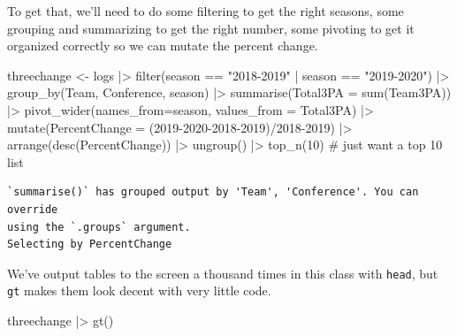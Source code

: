 \documentclass[
  letterpaper,
  DIV=11,
  numbers=noendperiod]{scrreprt}
\newenvironment{Shaded}{\begin{snugshade}}{\end{snugshade}}
\newcommand{\AttributeTok}[1]{\textcolor[rgb]{0.40,0.45,0.13}{#1}}
\newcommand{\CommentTok}[1]{\textcolor[rgb]{0.37,0.37,0.37}{#1}}
\newcommand{\DecValTok}[1]{\textcolor[rgb]{0.68,0.00,0.00}{#1}}
\newcommand{\FunctionTok}[1]{\textcolor[rgb]{0.28,0.35,0.67}{#1}}
\newcommand{\NormalTok}[1]{\textcolor[rgb]{0.00,0.23,0.31}{#1}}
\newcommand{\OtherTok}[1]{\textcolor[rgb]{0.00,0.23,0.31}{#1}}
\newcommand{\SpecialCharTok}[1]{\textcolor[rgb]{0.37,0.37,0.37}{#1}}
\newcommand{\StringTok}[1]{\textcolor[rgb]{0.13,0.47,0.30}{#1}}
\begin{document}
To get that, we'll need to do some filtering to get the right seasons,
some grouping and summarizing to get the right number, some pivoting to
get it organized correctly so we can mutate the percent change.

\begin{Shaded}
\begin{Highlighting}[]
\NormalTok{threechange }\OtherTok{\textless{}{-}}\NormalTok{ logs }\SpecialCharTok{|\textgreater{}}
  \FunctionTok{filter}\NormalTok{(season }\SpecialCharTok{==} \StringTok{"2018{-}2019"} \SpecialCharTok{|}\NormalTok{ season }\SpecialCharTok{==} \StringTok{"2019{-}2020"}\NormalTok{) }\SpecialCharTok{|\textgreater{}}
  \FunctionTok{group\_by}\NormalTok{(Team, Conference, season) }\SpecialCharTok{|\textgreater{}}
  \FunctionTok{summarise}\NormalTok{(}\AttributeTok{Total3PA =} \FunctionTok{sum}\NormalTok{(Team3PA)) }\SpecialCharTok{|\textgreater{}}
  \FunctionTok{pivot\_wider}\NormalTok{(}\AttributeTok{names\_from=}\NormalTok{season, }\AttributeTok{values\_from =}\NormalTok{ Total3PA) }\SpecialCharTok{|\textgreater{}}
  \FunctionTok{mutate}\NormalTok{(}\AttributeTok{PercentChange =}\NormalTok{ (}\StringTok{\textasciigrave{}}\AttributeTok{2019{-}2020}\StringTok{\textasciigrave{}}\SpecialCharTok{{-}}\StringTok{\textasciigrave{}}\AttributeTok{2018{-}2019}\StringTok{\textasciigrave{}}\NormalTok{)}\SpecialCharTok{/}\StringTok{\textasciigrave{}}\AttributeTok{2018{-}2019}\StringTok{\textasciigrave{}}\NormalTok{) }\SpecialCharTok{|\textgreater{}}
  \FunctionTok{arrange}\NormalTok{(}\FunctionTok{desc}\NormalTok{(PercentChange)) }\SpecialCharTok{|\textgreater{}} 
  \FunctionTok{ungroup}\NormalTok{() }\SpecialCharTok{|\textgreater{}}
  \FunctionTok{top\_n}\NormalTok{(}\DecValTok{10}\NormalTok{) }\CommentTok{\# just want a top 10 list}
\end{Highlighting}
\end{Shaded}

\begin{verbatim}
`summarise()` has grouped output by 'Team', 'Conference'. You can override
using the `.groups` argument.
Selecting by PercentChange
\end{verbatim}

We've output tables to the screen a thousand times in this class with
\texttt{head}, but \texttt{gt} makes them look decent with very little
code.

\begin{Shaded}
\begin{Highlighting}[]
\NormalTok{threechange }\SpecialCharTok{|\textgreater{}} \FunctionTok{gt}\NormalTok{()}
\end{Highlighting}
\end{Shaded}
\end{document}
